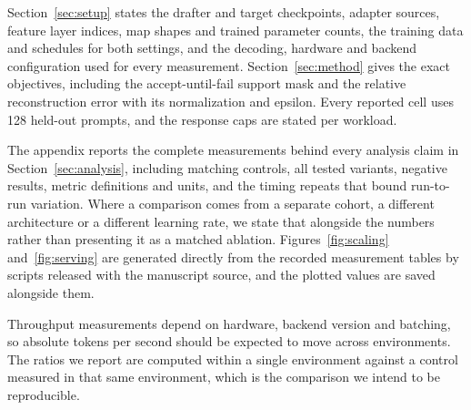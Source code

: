 Section~\ref{sec:setup} states the drafter and target checkpoints, adapter sources, feature layer indices, map shapes and trained parameter counts, the training data and schedules for both settings, and the decoding, hardware and backend configuration used for every measurement. Section~\ref{sec:method} gives the exact objectives, including the accept-until-fail support mask and the relative reconstruction error with its normalization and epsilon. Every reported cell uses 128 held-out prompts, and the response caps are stated per workload.

The appendix reports the complete measurements behind every analysis claim in Section~\ref{sec:analysis}, including matching controls, all tested variants, negative results, metric definitions and units, and the timing repeats that bound run-to-run variation. Where a comparison comes from a separate cohort, a different architecture or a different learning rate, we state that alongside the numbers rather than presenting it as a matched ablation. Figures~\ref{fig:scaling} and~\ref{fig:serving} are generated directly from the recorded measurement tables by scripts released with the manuscript source, and the plotted values are saved alongside them.

Throughput measurements depend on hardware, backend version and batching, so absolute tokens per second should be expected to move across environments. The ratios we report are computed within a single environment against a control measured in that same environment, which is the comparison we intend to be reproducible.
